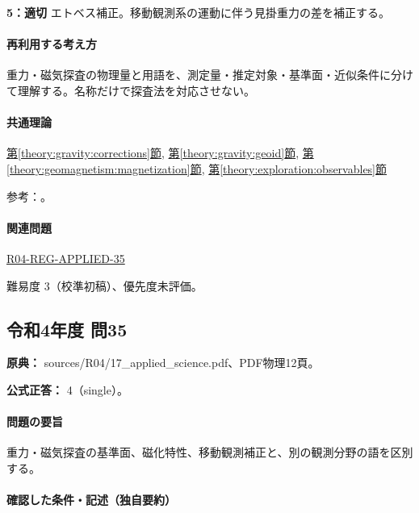 \noindent\textbf{5：適切} エトベス補正。移動観測系の運動に伴う見掛重力の差を補正する。\par

\paragraph{再利用する考え方} 重力・磁気探査の物理量と用語を、測定量・推定対象・基準面・近似条件に分けて理解する。名称だけで探査法を対応させない。

\paragraph{共通理論} \hyperref[theory:gravity:corrections]{第\ref*{theory:gravity:corrections}節}, \hyperref[theory:gravity:geoid]{第\ref*{theory:gravity:geoid}節}, \hyperref[theory:geomagnetism:magnetization]{第\ref*{theory:geomagnetism:magnetization}節}, \hyperref[theory:exploration:observables]{第\ref*{theory:exploration:observables}節}

\par 参考：\cite{gsi_gravity_definitions,kanaya_okuma2011}。

\paragraph{関連問題} \hyperref[q:r04-reg-applied-35]{R04-REG-APPLIED-35}

\par 難易度 3（校準初稿）、優先度未評価。

\subsection{令和4年度 問35}
\label{q:r04-reg-applied-35}

\noindent\textbf{原典：} sources/R04/17\_applied\_science.pdf、PDF物理12頁。

\textbf{公式正答：} 4（single）。

\paragraph{問題の要旨} 重力・磁気探査の基準面、磁化特性、移動観測補正と、別の観測分野の語を区別する。

\paragraph{確認した条件・記述（独自要約）}\mbox{}\par

